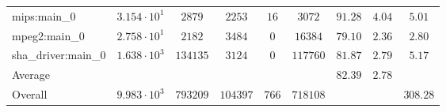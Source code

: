 \begin{tabular}{|l|c|c|c|c|c|c|c|c|}
mips:main\_0            & $ 3.154 \cdot 10^{1} $ & $ 2879   $ & $ 2253   $ & $ 16  $ & $ 3072   $ & $ 91.28       $ & $ 4.04    $ & $ 5.01    $ \\
mpeg2:main\_0           & $ 2.758 \cdot 10^{1} $ & $ 2182   $ & $ 3484   $ & $ 0   $ & $ 16384  $ & $ 79.10       $ & $ 2.36    $ & $ 2.80    $ \\
sha\_driver:main\_0     & $ 1.638 \cdot 10^{3} $ & $ 134135 $ & $ 3124   $ & $ 0   $ & $ 117760 $ & $ 81.87       $ & $ 2.79    $ & $ 5.17    $ \\
\hline
Average                 & $                    $ & $        $ & $        $ & $     $ & $        $ & $ 82.39       $ & $ 2.78    $ & $         $ \\
\hline
Overall                 & $ 9.983 \cdot 10^{3} $ & $ 793209 $ & $ 104397 $ & $ 766 $ & $ 718108 $ & $             $ & $         $ & $ 308.28  $ \\
\hline
\end{tabular}
